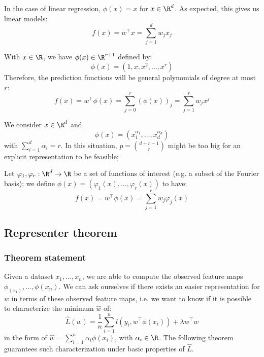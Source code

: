 \documentclass[toc]{../cs-classes/cs-classes}
\begin{document}
\begin{example}
    In the case of linear regression, $\phi(x)=x$ for $x\in\R^d$. As expected, this gives us linear models:
    \begin{equation*}
        f(x)=w^\top x = \sum_{j=1}^d w_jx_j
    \end{equation*}
\end{example}

\begin{example}
    With $x\in\R$, we have $\phi(x)\in\R^{r+1}$ defined by:
    \begin{equation*}
        \phi(x)=(1, x, x^2, \dots, x^r)
    \end{equation*}
    Therefore, the prediction functions will be general polynomials of degree at most $r$:
    \begin{equation*}
        f(x)=w^\top\phi(x)=\sum_{j=0}^r (\phi(x))_j = \sum_{j=1}^r w_jx^j
    \end{equation*}
\end{example}

\begin{example}
    We consider $x\in\R^d$ and
    \begin{equation*}
        \phi(x)=(x_1^{\alpha_1}, \dots, x_d^{\alpha_d})
    \end{equation*}
    with $\sum_{i=1}^d \alpha_i=r$. In this situation, $p=\binom{d+r-1}{r}$ might be too big for an explicit representation to be feasible;
\end{example}

\begin{example}
    Let $\varphi_1, \varphi_r : \R^d \to \R$ be a set of functions of interest (e.g. a subset of the Fourier basis); we define $\phi(x) = (\varphi_1(x), \dots, \varphi_r(x))$ to have:
    \begin{equation*}
        f(x)=w^\top \phi(x) = \sum_{j=1}^rw_j\varphi_j(x)
    \end{equation*}
\end{example}

\subsection{Representer theorem}
\subsubsection{Theorem statement}
Given a dataset $x_1, \dots, x_n$, we are able to compute the observed feature maps $\phi_(x_1), \dots, \phi(x_n)$. We can ask ourselves if there exists an easier representation for $w$ in terms of these observed feature maps, i.e. we want to know if it is possible to characterize the minimum $\hat{w}$ of:
\begin{equation*}
    \hat{L}(w) = \frac{1}{n}\sum_{i=1}^n l(y_i, w^\top\phi(x_i)) + \lambda w^\top w
\end{equation*}
in the form of $\hat{w} = \sum_{i=1}^n \alpha_i\phi(x_i)$, with $\alpha_i\in\R$. The following theorem guarantees such characterization under basic properties of $\hat{L}$.
\end{document}
